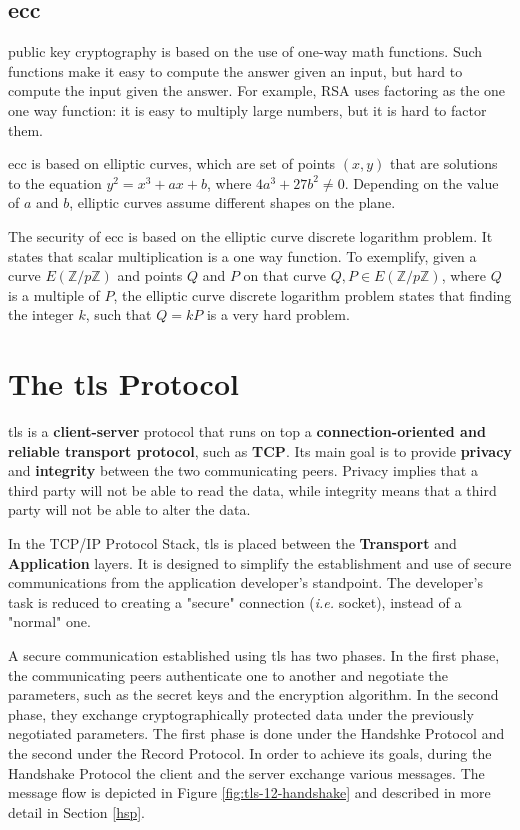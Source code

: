 \documentclass{llncs}
\begin{document}
\subsection{\gls{ecc}} \label{eccsection}

public key cryptography is based on the use of one-way math functions. Such
functions make it easy to compute the answer given an input,
but hard to compute the input given the answer. For example, RSA uses factoring
as the one one way function: it is easy to multiply large numbers, but it is hard
to factor them.

\gls{ecc} is based on elliptic curves, which are set of points $(x,y)$ that are
solutions to the equation $y^2 = x^3 + ax + b$, where $4a^3 + 27b^2 \neq 0$.
Depending on the value of $a$ and $b$, elliptic curves assume different shapes
on the plane.

The security of \gls{ecc} is based on the elliptic curve discrete logarithm
problem. It states that scalar multiplication is a one way function. To exemplify,
given a curve $E(\mathbb{Z}/p\mathbb{Z})$ and points $Q$ and $P$ on that curve
$Q,P \in E(\mathbb{Z}/p\mathbb{Z})$, where $Q$ is a multiple of $P$, the elliptic curve discrete logarithm problem
states that finding the integer $k$, such that $Q=kP$ is a very hard problem.

\section{The \gls{tls} Protocol}

\gls{tls} is a \textbf{client-server} protocol
that runs on top a \textbf{connection-oriented and reliable transport protocol},
such as \textbf{TCP}. Its main goal is to provide \textbf{privacy} and \textbf{integrity}
between the two communicating peers. Privacy implies that a third party will not
be able to read the data, while integrity means that a third party will not be
able to alter the data.

In the TCP/IP Protocol Stack, \gls{tls} is placed between the \textbf{Transport}
and \textbf{Application} layers. It is designed to simplify the establishment
and use of secure communications from the application developer's standpoint.
The developer's task is reduced to creating a "secure" connection (\textit{i.e.} socket), instead of a "normal" one.

A secure communication established using \gls{tls} has two phases. In the first
phase, the communicating peers authenticate one to another and negotiate the parameters, such as the secret keys and the encryption algorithm. In the
second phase, they exchange cryptographically protected data under
the previously negotiated parameters. The first phase is done under the
Handshke Protocol and the second under the Record Protocol. In order to
achieve its goals, during the Handshake Protocol the client and the server
exchange various messages. The message flow is depicted in Figure \ref{fig:tls-12-handshake} and described in more detail in Section
\ref{hsp}.
\end{document}
